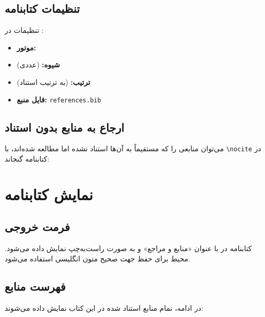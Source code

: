 \documentclass{matinbook}
\begin{document}
\section{تنظیمات کتابنامه}

تنظیمات  در :

\begin{itemize}
    \item \textbf{موتور:} 
    \item \textbf{شیوه:}  (عددی)
    \item \textbf{ترتیب:}  (به ترتیب استناد)
    \item \textbf{فایل منبع:} \texttt{references.bib}
\end{itemize}

\section{ارجاع به منابع بدون استناد}

می‌توان منابعی را که مستقیماً به آن‌ها استناد نشده
اما مطالعه شده‌اند، با \texttt{\textbackslash nocite}
در کتابنامه گنجاند:


\chapter{نمایش کتابنامه}

\section{فرمت خروجی}

کتابنامه در  با عنوان «منابع و مراجع»
و به صورت راست‌به‌چپ نمایش داده می‌شود.
محیط  برای حفظ جهت صحیح متون انگلیسی
استفاده می‌شود.

\section{فهرست منابع}

در ادامه، تمام منابع استناد شده در این کتاب
نمایش داده می‌شوند:

\begin{latin}
\printbibliography[title={منابع و مراجع}]
\end{latin}
\end{document}

